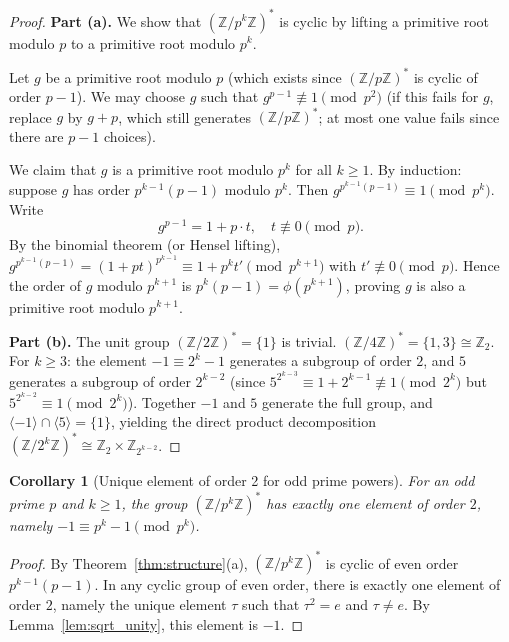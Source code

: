 \documentclass[12pt,a4paper]{amsart}
\newtheorem{corollary}[theorem]{Corollary}
\theoremstyle{definition}
\newcommand{\Z}{\mathbb{Z}}
\begin{document}
\begin{proof}
  \textbf{Part (a).}
  We show that $(\Z/p^k\Z)^*$ is cyclic by lifting a primitive root modulo $p$
  to a primitive root modulo $p^k$.

  Let $g$ be a primitive root modulo $p$ (which exists since $(\Z/p\Z)^*$ is
  cyclic of order $p-1$).  We may choose $g$ such that $g^{p-1} \not\equiv 1
  \pmod{p^2}$ (if this fails for $g$, replace $g$ by $g + p$, which still
  generates $(\Z/p\Z)^*$; at most one value fails since there are $p-1$ choices).

  We claim that $g$ is a primitive root modulo $p^k$ for all $k \geq 1$.
  By induction: suppose $g$ has order $p^{k-1}(p-1)$ modulo $p^k$.
  Then $g^{p^{k-1}(p-1)} \equiv 1 \pmod{p^k}$.  Write
  \[
    g^{p-1} = 1 + p \cdot t, \quad t \not\equiv 0 \pmod p.
  \]
  By the binomial theorem (or Hensel lifting),
  $g^{p^{k-1}(p-1)} = (1 + pt)^{p^{k-1}} \equiv 1 + p^k t' \pmod{p^{k+1}}$
  with $t' \not\equiv 0 \pmod p$.
  Hence the order of $g$ modulo $p^{k+1}$ is $p^k(p-1) = \phi(p^{k+1})$,
  proving $g$ is also a primitive root modulo $p^{k+1}$.

  \textbf{Part (b).}
  The unit group $(\Z/2\Z)^* = \{1\}$ is trivial.
  $(\Z/4\Z)^* = \{1, 3\} \cong \Z_2$.
  For $k \geq 3$: the element $-1 \equiv 2^k - 1$ generates a subgroup of
  order $2$, and $5$ generates a subgroup of order $2^{k-2}$ (since
  $5^{2^{k-3}} \equiv 1 + 2^{k-1} \not\equiv 1 \pmod{2^k}$ but
  $5^{2^{k-2}} \equiv 1 \pmod{2^k}$).
  Together $-1$ and $5$ generate the full group, and
  $\langle -1 \rangle \cap \langle 5 \rangle = \{1\}$, yielding the direct
  product decomposition $(\Z/2^k\Z)^* \cong \Z_2 \times \Z_{2^{k-2}}$.
\end{proof}

\begin{corollary}[Unique element of order 2 for odd prime powers]%
  \label{cor:unique_order2}
  For an odd prime $p$ and $k \geq 1$, the group $(\Z/p^k\Z)^*$ has exactly
  one element of order $2$, namely $-1 \equiv p^k - 1 \pmod{p^k}$.
\end{corollary}

\begin{proof}
  By Theorem~\ref{thm:structure}(a), $(\Z/p^k\Z)^*$ is cyclic of even order
  $p^{k-1}(p-1)$.  In any cyclic group of even order, there is exactly one
  element of order $2$, namely the unique element $\tau$ such that $\tau^2 = e$
  and $\tau \neq e$.  By Lemma~\ref{lem:sqrt_unity}, this element is $-1$.
\end{proof}
\end{document}
